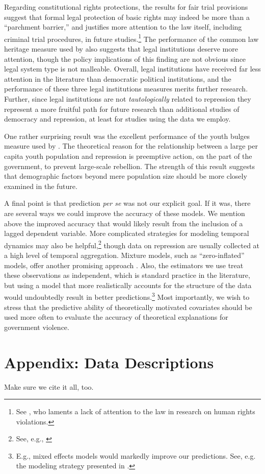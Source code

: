 \documentclass[12pt]{article}
\begin{document}
Regarding constitutional rights protections, the results for fair trial provisions suggest that formal legal protection of basic rights may indeed be more than a ``parchment barrier,'' \citep[See][]{KeithTatePoe2009} and justifies more attention to the law itself, including criminal trial procedures, in future studies.\footnote{See \citet{Cross1999}, who laments a lack of attention to the law in research on human rights violations.} The performance of the common law heritage measure used by \citet{Mitchell2013} also suggests that legal institutions deserve more attention, though the policy implications of this finding are not obvious since legal system type is not malleable. Overall, legal institutions have received far less attention in the literature than democratic political institutions, and the performance of these three legal institutions measures merits further research. Further, since legal institutions are not {\it tautologically} related to repression they represent a more fruitful path for future research than additional studies of democracy and repression, at least for studies using the data we employ. 

One rather surprising result was the excellent performance of the youth bulges measure used by \citet{NordasDavenport2013}. The theoretical reason for the relationship between a large per capita youth population and repression is preemptive action, on the part of the government, to prevent large-scale rebellion. The strength of this result suggests that demographic factors beyond mere population size should be more closely examined in the future. 

A final point is that prediction {\it per se} was not our explicit goal. If it was, there are several ways we could improve the accuracy of these models. We mention above the improved accuracy that would likely result from the inclusion of a lagged dependent variable. More complicated strategies for modeling temporal dynamics may also be helpful,\footnote{See, e.g., \citep{Brandtetal2011}} though data on repression are usually collected at a high level of temporal aggregation. Mixture models, such as ``zero-inflated'' models, offer another promising approach \citep[See, e.g.][]{Bagozzietal2013,Bagozzi2013}. Also, the estimators we use treat these observations as independent, which is standard practice in the literature, but using a model that more realistically accounts for the structure of the data would undoubtedly result in better predictions.\footnote{E.g., mixed effects models would markedly improve our predictions. See, e.g. the modeling strategy presented in \citet{Wardetal2012}.} Most importantly, we wish to stress that the predictive ability of theoretically motivated covariates should be used more often to evaluate the accuracy of theoretical explanations for government violence.

\newpage
\begin{singlespace}


\end{singlespace}

\appendix
\section{Appendix: Data Descriptions}

{\sf Make sure we cite it all, too.}
\end{document}
